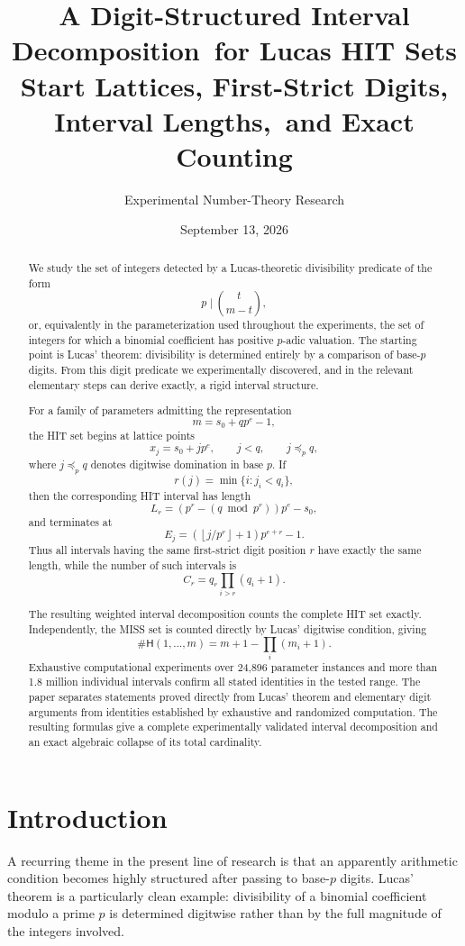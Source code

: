 \documentclass[11pt,a4paper]{article}
\title{\textbf{A Digit-Structured Interval Decomposition\ for Lucas HIT Sets}\\
\large Start Lattices, First-Strict Digits, Interval Lengths,\ and Exact Counting}
\author{Experimental Number-Theory Research}
\date{September 13, 2026}
\theoremstyle{definition}
\theoremstyle{remark}
\newcommand{\hit}{\mathsf{H}}
\begin{document}
\maketitle

\begin{abstract}
We study the set of integers detected by a Lucas-theoretic divisibility predicate of the form
\[
 p \mid \binom{t}{m-t},
\]
or, equivalently in the parameterization used throughout the experiments, the set of integers for which a binomial coefficient has positive $p$-adic valuation.  The starting point is Lucas' theorem: divisibility is determined entirely by a comparison of base-$p$ digits.  From this digit predicate we experimentally discovered, and in the relevant elementary steps can derive exactly, a rigid interval structure.

For a family of parameters admitting the representation
\[
 m=s_0+q p^e-1,
\]
the HIT set begins at lattice points
\[
 x_j=s_0+jp^e,
\qquad
j<q,\qquad j\preceq_p q,
\]
where $j\preceq_p q$ denotes digitwise domination in base $p$.  If
\[
 r(j)=\min\{i:j_i<q_i\},
\]
then the corresponding HIT interval has length
\[
 L_{r}=
 \left(p^r-(q\bmod p^r)\right)p^e-s_0,
\]
and terminates at
\[
 E_j=
 \left(\left\lfloor j/p^r\right\rfloor+1\right)p^{e+r}-1.
\]
Thus all intervals having the same first-strict digit position $r$ have exactly the same length, while the number of such intervals is
\[
 C_r=q_r\prod_{i>r}(q_i+1).
\]

The resulting weighted interval decomposition counts the complete HIT set exactly. Independently, the MISS set is counted directly by Lucas' digitwise condition, giving
\[
 \#\hit(1,\dots,m)
 =m+1-\prod_i(m_i+1).
\]
Exhaustive computational experiments over 24,896 parameter instances and more than 1.8 million individual intervals confirm all stated identities in the tested range. The paper separates statements proved directly from Lucas' theorem and elementary digit arguments from identities established by exhaustive and randomized computation. The resulting formulas give a complete experimentally validated interval decomposition and an exact algebraic collapse of its total cardinality.
\end{abstract}

\section{Introduction}

A recurring theme in the present line of research is that an apparently arithmetic condition becomes highly structured after passing to base-$p$ digits.  Lucas' theorem is a particularly clean example: divisibility of a binomial coefficient modulo a prime $p$ is determined digitwise rather than by the full magnitude of the integers involved.
\end{document}
